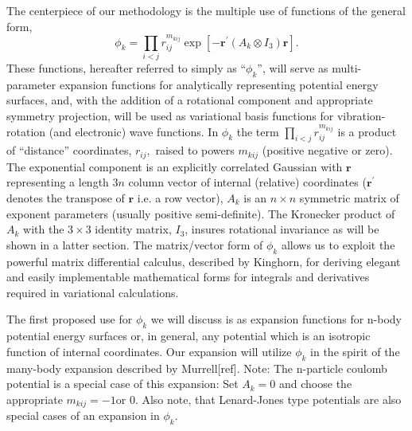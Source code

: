 \documentclass[12pt,thmsa]{article}
\begin{document}
The centerpiece of our methodology is the multiple use of functions of the
general form, 
\begin{equation}
\phi _k=\prod_{i<j}r_{ij}^{m_{kij}}\exp \left[ -\mathbf{r}^{\prime
}(A_k\otimes I_3)\mathbf{r}\right] .  \label{basisfcn}
\end{equation}
These functions, hereafter referred to simply as ``$\phi _k$'', will serve
as multi-parameter expansion functions for analytically representing
potential energy surfaces, and, with the addition of a rotational component
and appropriate symmetry projection, will be used as variational basis
functions for vibration-rotation (and electronic) wave functions. In $\phi
_k $ the term $\prod_{i<j}r_{ij}^{m_{kij}}$ is a product of ``distance''
coordinates, $r_{ij},$ raised to powers $m_{kij}$ (positive negative or
zero). The exponential component is an explicitly correlated Gaussian with $%
\mathbf{r}$ representing a length $3n$ column vector of internal (relative)
coordinates ($\mathbf{r}^{\prime }$ denotes the transpose of $\mathbf{r}$
i.e. a row vector), $A_k$ is an $n\times n$ symmetric matrix of exponent
parameters (usually positive semi-definite). The Kronecker product of $A_k$
with the $3\times 3$ identity matrix, $I_3$, insures rotational invariance
as will be shown in a latter section. The matrix/vector form of $\phi _k$
allows us to exploit the powerful matrix differential calculus, described by
Kinghorn\cite{Kinghorn95}, for deriving elegant and easily implementable
mathematical forms for integrals and derivatives required in variational
calculations.

The first proposed use for $\phi _k$ we will discuss is as expansion
functions for n-body potential energy surfaces or, in general, any potential
which is an isotropic function of internal coordinates. Our expansion will
utilize $\phi _k$ in the spirit of the many-body expansion described by
Murrell[ref]. Note: The n-particle coulomb potential is a special case of
this expansion: Set $A_k=0$ and choose the appropriate $m_{kij}=-1$or $0$.
Also note, that Lenard-Jones type potentials are also special cases of an
expansion in $\phi _k.$
\end{document}
